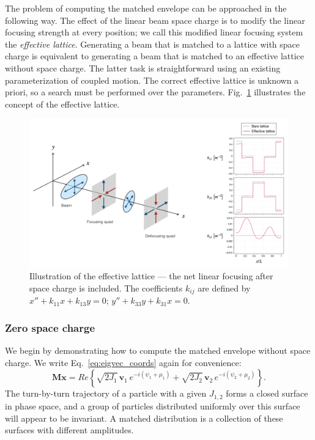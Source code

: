 The problem of computing the matched envelope can be approached in the following way. The effect of the linear beam space charge is to modify the linear focusing strength at every position; we call this modified linear focusing system the \textit{effective lattice}. Generating a beam that is matched to a lattice with space charge is equivalent to generating a beam that is matched to an effective lattice without space charge. The latter task is straightforward using an existing parameterization of coupled motion. The correct effective lattice is unknown a priori, so a search must be performed over the parameters. Fig.~\ref{fig:effective_lattice} illustrates the concept of the effective lattice.
%
\begin{figure}
    \centering
    \includegraphics[width=1.0\textwidth]{Images/chapter2/effective_lattice.png}
    \caption{Illustration of the effective lattice — the net linear focusing after space charge is included. The coefficients $k_{ij}$ are defined by $x'' + k_{11}x + k_{13}y = 0$; $y'' + k_{33}y + k_{31}x = 0$.}
    \label{fig:effective_lattice}
\end{figure}
%

\subsubsection{Zero space charge}

We begin by demonstrating how to compute the matched envelope without space charge. We write Eq.~\eqref{eq:eigvec_coords} again for convenience:
%
\begin{equation}
    \mathbf{Mx} = Re \left\{
        \sqrt{2 J_1} \, \mathbf{v}_1 \, e^{-i(\psi_1 + \mu_1)}
        + \sqrt{2 J_2} \, \mathbf{v}_2 \, e^{-i(\psi_2 + \mu_2)}
    \right\}.
\end{equation}
%
The turn-by-turn trajectory of a particle with a given $J_{1,2}$ forms a closed surface in phase space, and a group of particles distributed uniformly over this surface will appear to be invariant. A matched distribution is a collection of these surfaces with different amplitudes.

